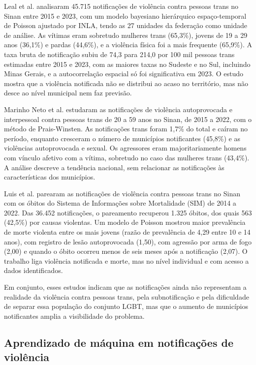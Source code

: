 \documentclass[12pt]{article}
\begin{document}
Leal et al. \cite{leal_silva_lizzi:2026} analisaram 45.715 notificações de violência contra pessoas trans no Sinan entre 2015 e 2023, com um modelo bayesiano hierárquico espaço-temporal de Poisson ajustado por INLA, tendo as 27 unidades da federação como unidade de análise. As vítimas eram sobretudo mulheres trans (65,3\%), jovens de 19 a 29 anos (36,1\%) e pardas (44,6\%), e a violência física foi a mais frequente (65,9\%). A taxa bruta de notificação subiu de 74,3 para 214,0 por 100 mil pessoas trans estimadas entre 2015 e 2023, com as maiores taxas no Sudeste e no Sul, incluindo Minas Gerais, e a autocorrelação espacial só foi significativa em 2023. O estudo mostra que a violência notificada não se distribui ao acaso no território, mas não desce ao nível municipal nem faz previsão.

Marinho Neto et al. \cite{marinho_tomazelli_firianelli:2024} estudaram as notificações de violência autoprovocada e interpessoal contra pessoas trans de 20 a 59 anos no Sinan, de 2015 a 2022, com o método de Prais-Winsten. As notificações trans foram 1,7\% do total e caíram no período, enquanto cresceram o número de municípios notificantes (45,8\%) e as violências autoprovocada e sexual. Os agressores eram majoritariamente homens com vínculo afetivo com a vítima, sobretudo no caso das mulheres trans (43,4\%). A análise descreve a tendência nacional, sem relacionar as notificações às características dos municípios.

Luis et al. \cite{luis:2025} parearam as notificações de violência contra pessoas trans no Sinan com os óbitos do Sistema de Informações sobre Mortalidade (SIM) de 2014 a 2022. Das 36.452 notificações, o pareamento recuperou 1.325 óbitos, dos quais 563 (42,5\%) por causas violentas. Um modelo de Poisson mostrou maior prevalência de morte violenta entre os mais jovens (razão de prevalência de 4,29 entre 10 e 14 anos), com registro de lesão autoprovocada (1,50), com agressão por arma de fogo (2,00) e quando o óbito ocorreu menos de seis meses após a notificação (2,07). O trabalho liga violência notificada e morte, mas no nível individual e com acesso a dados identificados.

Em conjunto, esses estudos indicam que as notificações ainda não representam a realidade da violência contra pessoas trans, pela subnotificação e pela dificuldade de separar essa população do conjunto LGBT, mas que o aumento de municípios notificantes amplia a visibilidade do problema.

\subsection{Aprendizado de máquina em notificações de violência}
\end{document}
